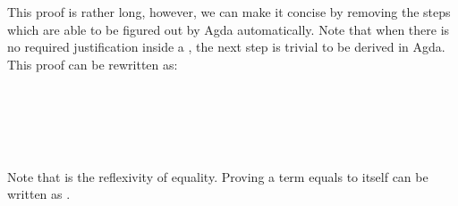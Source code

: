 \documentclass{l4proj}
\begin{document}
This proof is rather long, however, we can make it concise by removing the steps which are able to be figured out by Agda automatically. Note that when there is no required justification inside a , the next step is trivial to be derived in Agda. This proof can be rewritten as:
\begin{code}%
\>[0]\<%
\\
\>[0]\AgdaSpace{}%
\AgdaSymbol{:}%
\>[702I]\AgdaSymbol{\{}\AgdaSpace{}%
\AgdaSymbol{:}\AgdaSpace{}%
\AgdaSymbol{\}}\AgdaSpace{}%
\AgdaSpace{}%
\AgdaSymbol{\{}\AgdaSpace{}%
\AgdaSpace{}%
\AgdaSpace{}%
\AgdaSymbol{:}\AgdaSpace{}%
\AgdaSymbol{\}}\AgdaSpace{}%
\AgdaSpace{}%
\AgdaSymbol{(}\AgdaSpace{}%
\AgdaSymbol{:}\AgdaSpace{}%
\AgdaSpace{}%
\AgdaSpace{}%
\AgdaSymbol{)}\AgdaSpace{}%
\AgdaSpace{}%
\AgdaSymbol{(}\AgdaSpace{}%
\AgdaSymbol{:}\AgdaSpace{}%
\AgdaSpace{}%
\AgdaSpace{}%
\AgdaSymbol{)}\AgdaSpace{}%
\AgdaSpace{}%
\AgdaSymbol{(}\AgdaSpace{}%
\AgdaSymbol{:}\AgdaSpace{}%
\AgdaSpace{}%
\AgdaSpace{}%
\AgdaSymbol{)}\AgdaSpace{}%
\<%
\\
\>[.][@{}l@{}]\<[702I]%
\>[10]\AgdaSymbol{(}\AgdaSpace{}%
\AgdaSpace{}%
\AgdaSpace{}%
\AgdaSpace{}%
\AgdaSymbol{)}\AgdaSpace{}%
\AgdaSpace{}%
\AgdaSpace{}%
\AgdaSpace{}%
\AgdaSymbol{(}\AgdaSpace{}%
\AgdaSpace{}%
\AgdaSymbol{)}\AgdaSpace{}%
\<%
\\
\>[0]\AgdaSpace{}%
\AgdaSpace{}%
\AgdaSpace{}%
\AgdaInductiveConstructor{[]}\AgdaSpace{}%
\AgdaSymbol{=}\AgdaSpace{}%
\<%
\\
\>[0]\AgdaSpace{}%
\AgdaSpace{}%
\AgdaSpace{}%
\AgdaSymbol{(}\AgdaSpace{}%
\AgdaSpace{}%
\AgdaSymbol{)}\AgdaSpace{}%
\AgdaSymbol{=}\AgdaSpace{}%
\AgdaSpace{}%
\AgdaSymbol{((}\AgdaSpace{}%
\AgdaSpace{}%
\AgdaSymbol{)}\AgdaSpace{}%
\AgdaSpace{}%
\AgdaSpace{}%
\AgdaSymbol{)}\AgdaSpace{}%
\AgdaSymbol{(}\AgdaSpace{}%
\AgdaSpace{}%
\AgdaSpace{}%
\AgdaSymbol{)}\<%
\end{code}
Note that  is the reflexivity of equality. Proving a term equals to itself can be written as .
\end{document}
